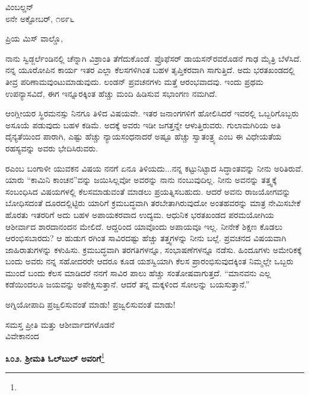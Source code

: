 \begin{flushright}
ವಿಂಬಲ್ಡನ್\\೮ನೇ ಅಕ್ಟೋಬರ್, ೧೮೯೬
\end{flushright}
\vspace{-0.2cm}

\noindent
ಪ್ರಿಯ ಮಿಸ್‌ ವಾಲ್ಡೊ,

ನಾನು ಸ್ವಿಡ್ಜರ್ಲೆಂಡಿನಲ್ಲಿ ಚೆನ್ನಾಗಿ ವಿಶ್ರಾಂತಿ ತೆಗೆದುಕೊಂಡೆ. ಪ್ರೊಫೆಸರ್ ಡಾಯಸನ್‌ರವರೊಡನೆ ಗಾಢ ಮೈತ್ರಿ ಬೆಳೆಸಿದೆ. ನನ್ನ ಯೂರೋಪಿನ ಕಾರ್ಯ ಇತರ ಎಲ್ಲಾ ಕೆಲಸಗಳಿಗಿಂತ ಬಹಳ ತೃಪ್ತಿಕರವಾಗಿ ಸಾಗುತ್ತಿದೆ. ಅದು ಭರತಖಂಡದಲ್ಲಿ ತೀವ್ರ ಪರಿಣಾಮವುಂಟುಮಾಡುವುದು. ಲಂಡನ್ ಪ್ರವಚನಗಳು ಮತ್ತೆ ಆರಂಭವಾದವು. ಇಂದು ಪ್ರಥಮ ಉಪನ್ಯಾಸವಿದೆ, ಈಗ ಇನ್ನೂರಕ್ಕಿಂತ ಹೆಚ್ಚು ಮಂದಿ ಹಿಡಿಸುವ ಸಭಾಂಗಣ ನಮಗಿದೆ.

ಆಂಗ್ಲೀಯರ ಸ್ಥಿರಮನಸ್ಸು ನಿನಗೂ ತಿಳಿದ ವಿಷಯವೇ. ಇತರ ಜನಾಂಗಗಳಿಗೆ ಹೋಲಿಸಿದರೆ ಇವರಲ್ಲಿ ಒಬ್ಬರಿಗೊಬ್ಬರು ಅಸೂಯೆ ಪಡುವುದು ಬಹಳ ಕಡಿಮೆ. ಅದಕ್ಕೆ ಅವರು ಇಡೀ ಜಗತ್ತನ್ನೇ ಆಳುತ್ತಿರುವರು. ಗುಲಾಮಗಿರಿಯ ಅತಿ ದೈನ್ಯತೆಯಿಂದ ಪಾರಾಗಿ, ಎಷ್ಟು ಹೆಚ್ಚು ನ್ಯಾಯಸಂಧನಾದರೆ ಅಷ್ಟೂ ಹೆಚ್ಚು ಸ್ವಾತಂತ್ರ್ಯ ಎಂಬ ಈ ವಿಧೇಯತೆಯ ರಹಸ್ಯವನ್ನು ಅವರು ಭೇದಿಸಿರುವರು.

ರ\enginline{-}ಎಂಬ ಬಂಗಾಳೀ ಯುವಕನ ವಿಷಯ ನನಗೆ ಏನೂ ತಿಳಿಯದು...ನನ್ನ ಕಟ್ಟುನಿಟ್ಟಾದ ಸಿದ್ಧಾಂತವನ್ನು ನೀನು ಅರಿತಿರುವೆ. ಯಾರು “ಕಾಮಿನಿ ಕಾಂಚನ”ವನ್ನು ಜಯಿ\break ಸಿಲ್ಲವೋ ಅವರನ್ನು ನಾನು ನಂಬುವುದಿಲ್ಲ. ನೀನು ಅವನನ್ನು ತತ್ತ್ವಕ್ಕೆ ಸಂಬಂಧಿಸಿದ ವಿಷಯಗಳಲ್ಲಿ ಕೆಲಸಮಾಡುವಂತೆ ಮಾಡಲು ಪ್ರಯತ್ನಿಸಬಹುದು. ಆದರೆ ಅವನು ರಾಜಯೋಗವನ್ನು ಬೋಧಿಸದಂತೆ ದೂರದಲ್ಲಿಟ್ಟಿರು\enginline{-} ಯಾರಿಗೆ ಕ್ರಮಬದ್ಧವಾಗಿ ತರಬೇತಾಗಿರುವುದೋ ಅಂತಹವರನ್ನು ಮಾತ್ರ ನೇಮಿಸಬೇಕೆ ಹೊರತು ಇತರರಿಗೆ ಅದು ಬಹಳ ಅಪಾಯಕರವಾದ ಉದ್ಯಮ. ಆಧುನಿಕ ಭರತಖಂಡದ ಪರಮಯೋಗಿಯ ಆಶೀರ್ವಾದ ಶಾರದಾನಂದನ ಮೇಲಿದೆ. ಆದ್ದರಿಂದ ಯಾವೊಂದು ಅಪಾಯವೂ ಇಲ್ಲ. ನೀನೇಕೆ ಶಿಕ್ಷಣ ಕೊಡಲು ಆರಂಭಿಸಬಾರದು? ಆ ಹುಡುಗ ರ\enginline{-}ಗಿಂತ ಸಾವಿರದಷ್ಟು ಹೆಚ್ಚು ತತ್ತ್ವಗಳನ್ನು ನೀನು ಬಲ್ಲೆ. ಪ್ರವಚನದ ವಿಷಯವಾಗಿ ಜಾಹಿರಾತುಗಳನ್ನು ಕಳುಹಿಸು. ಕ್ರಮಬದ್ಧವಾಗಿ ತರಗತಿಗಳನ್ನೂ, ಸಂಭಾಷಣೆಗಳನ್ನೂ ನಡೆಸು. ಹಿಂದೂಗಳು ಅಮೇರಿಕಕ್ಕೆ ಬಂದು\enginline{-} ಅವರು ನನ್ನ ಸಹೋದರರೇ ಆದರೂ ಕೂಡ\enginline{-} ಯಶಸ್ವಿಯಾಗಿ ಕೆಲಸ ಪ್ರಾರಂಭಿಸುವುದಕ್ಕಿಂತ ನಿಮ್ಮಲ್ಲೇ ಒಬ್ಬರು ಮುಂದೆ ಬಂದು ಕೆಲಸ ಮಾಡಿದರೆ ನನಗೆ ಸಾವಿರ ಪಾಲು ಹೆಚ್ಚು ಸಂತೋಷವಾಗುತ್ತದೆ. “ಮಾನವನು ಎಲ್ಲ ಕಡೆಯಿಂದಲೂ ಜಯವನ್ನು ಅಪೇಕ್ಷಿಸುತ್ತಾನೆ. ಆದರೆ ತನ್ನ ಮಕ್ಕಳಿಂದ ಸೋಲನ್ನು ಬಯಸುತ್ತಾನೆ.”

ಅಗ್ನಿಯೋಪಾದಿ ಪ್ರಜ್ವಲಿಸುವಂತೆ ಮಾಡು! ಪ್ರಜ್ವಲಿಸುವಂತೆ ಮಾಡು!

{\flushright
ಸಮಸ್ತ ಪ್ರೀತಿ ಮತ್ತು ಆಶೀರ್ವಾದಗಳೊಡನೆ\\ವಿವೇಕಾನಂದ\par}

\begin{center}
\textbf{೩೦೨. ಶ‍್ರೀಮತಿ ಓಲ್‌ಬುಲ್‌ ಅವರಿಗೆ}\footnote{}
\end{center}
\vspace{-0.3cm}

